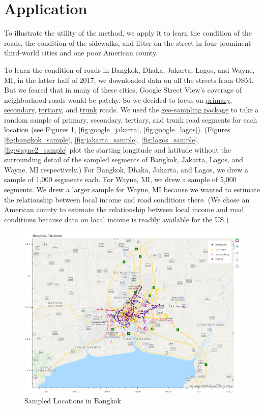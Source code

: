 \documentclass[12pt, letterpaper]{article}
\begin{document}
\section*{Application}

To illustrate the utility of the method, we apply it to learn the condition of the roads, the condition of the sidewalks, and litter on the street in four prominent third-world cities and one poor American county.

To learn the condition of roads in Bangkok, Dhaka, Jakarta, Lagos, and Wayne, MI, in the latter half of 2017, we downloaded data on all the streets from OSM. But we feared that in many of these cities, Google Street View's coverage of neighborhood roads would be patchy. So we decided to focus on \href{https://wiki.openstreetmap.org/wiki/Tag:highway=primary}{primary}, \href{https://wiki.openstreetmap.org/wiki/Tag:highway=secondary}{secondary}, \href{https://wiki.openstreetmap.org/wiki/Tag:highway=tertiary}{tertiary}, and \href{https://wiki.openstreetmap.org/wiki/Tag:highway=trunk}{trunk} roads. We used the \href{https://github.com/geosensing/geo_sampling}{geo-sampling package} to take a random sample of primary, secondary, tertiary, and trunk road segments for each location (see Figures \ref{fig:google_bangkok}, \ref{fig:google_jakarta}, \ref{fig:google_lagos}). (Figures \ref{fig:bangkok_sample}, \ref{fig:jakarta_sample}, \ref{fig:lagos_sample}, \ref{fig:wayne2_sample} plot the starting longitude and latitude without the surrounding detail of the sampled segments of Bangkok, Jakarta, Lagos, and Wayne, MI respectively.) For Bangkok, Dhaka, Jakarta, and Lagos,  we drew a sample of 1,000 segments each. For Wayne, MI, we drew a sample of 5,000 segments. We drew a larger sample for Wayne, MI because we wanted to estimate the relationship between local income and road conditions there. (We chose an American county to estimate the relationship between local income and road conditions because data on local income is readily available for the US.)

\begin{figure}[H]
\centering
\caption{Sampled Locations in Bangkok} \label{fig:google_bangkok}
    \includegraphics[width=\textwidth]{../figs/bangkok-gmap.png}
\end{figure}
\end{document}
